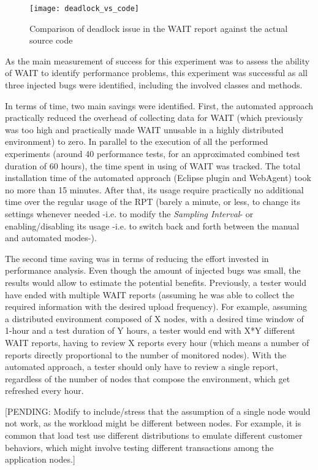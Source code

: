 \documentclass[runningheads,a4paper]{llncs}
\begin{document}
\begin{figure}[!h]
\texttt{[image: deadlock\_vs\_code]}
\caption{Comparison of deadlock issue in the WAIT report against the
actual source code}
\label{fig_dlissue_vs_code}
\end{figure}

As the main measurement of success for this experiment was to assess the
ability of WAIT to identify performance problems, this experiment was
successful as all three injected bugs were identified, including the
involved classes and methods. 

In terms of time, two main savings were identified. First, the automated
approach practically reduced the overhead of collecting data for WAIT (which
previously was too high and practically made WAIT unusable in a highly
distributed environment) to zero. In parallel to the execution of all the performed 
experiments (around 40 performance tests, for an approximated combined test
duration of 60 hours), the time spent in using of WAIT was tracked. The total 
installation time of the automated approach (Eclipse plugin and WebAgent) took
no more than 15 minutes. After that, its usage require practically no additional time over the regular usage of the
RPT (barely a minute, or less, to change its settings whenever needed -i.e. to
modify the \emph{Sampling Interval}- or enabling/disabling its usage -i.e. to
switch back and forth between the manual and automated modes-).

The second time saving was in terms of reducing the effort invested
in performance analysis. Even though the amount of injected bugs was
small, the results would allow to estimate the potential benefits. Previously, 
a tester would have ended with multiple WAIT reports (assuming he was able to
collect the required information with the desired upload frequency). For
example, assuming a distributed environment composed of X nodes, with a desired
time window of 1-hour and a test duration of Y hours, a tester would end with X*Y 
different WAIT reports, having to review X reports every hour (which means a
number of reports directly proportional to the number of monitored nodes). With
the automated approach, a tester should only have to review a single report,
regardless of the number of nodes that compose the environment, which get refreshed 
every hour.

[PENDING: Modify to include/stress that the assumption of a single node would
not work, as the workload might be different between nodes. For example, it is
common that load test use different distributions to emulate different
customer behaviors, which might involve testing different transactions among
the application nodes.]
\end{document}
